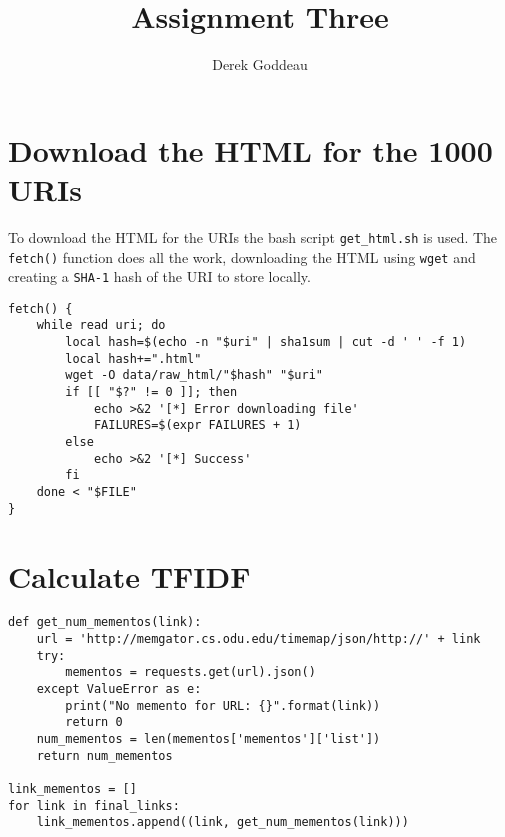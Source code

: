 \documentclass[12pt, a4paper]{article}
\author{Derek Goddeau}
\title{Assignment Three}
\newcommand{\code}[1]{\texttt{#1}}
\begin{document}
\maketitle

\newpage



\section{Download the HTML for the 1000 URIs}

To download the HTML for the URIs the bash script \code{get\_html.sh}
is used. The \code{fetch()} function does all the work, downloading the
HTML using \code{wget} and creating a \code{SHA-1} hash of the URI
to store locally.

\begin{minipage}{\linewidth} %
\vspace{2em}
\begin{verbatim}
fetch() {
    while read uri; do
        local hash=$(echo -n "$uri" | sha1sum | cut -d ' ' -f 1)
        local hash+=".html"
        wget -O data/raw_html/"$hash" "$uri"
        if [[ "$?" != 0 ]]; then
            echo >&2 '[*] Error downloading file'
            FAILURES=$(expr FAILURES + 1)
        else
            echo >&2 '[*] Success'
        fi
    done < "$FILE"
}
\end{verbatim}
\end{minipage}


\section{Calculate TFIDF}

\begin{minipage}{\linewidth} %
\vspace{2em}
\begin{verbatim}
def get_num_mementos(link):
    url = 'http://memgator.cs.odu.edu/timemap/json/http://' + link
    try:
        mementos = requests.get(url).json()
    except ValueError as e:
        print("No memento for URL: {}".format(link))
        return 0
    num_mementos = len(mementos['mementos']['list'])
    return num_mementos

link_mementos = []
for link in final_links:
    link_mementos.append((link, get_num_mementos(link)))
\end{verbatim}
\end{minipage}
\end{document}
